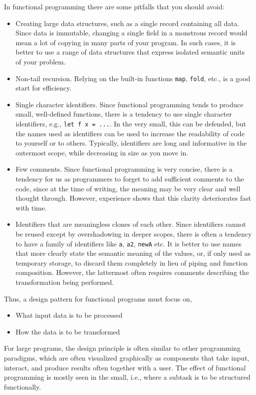 \documentclass[fsharpnotes.tex]{subfiles}
\begin{document}
In functional programming there are some pitfalls that you should avoid:
\begin{itemize}
\item Creating large data structures, such as a single record containing all data. Since data is immutable, changing a single field in a monstrous record would mean a lot of copying in many parts of your program. In such cases, it is better to use a range of data structures that express isolated semantic units of your problem.
\item Non-tail recursion. Relying on the built-in functions \lstinline{map}, \lstinline{fold}, etc., is a good start for efficiency.
\item Single character identifiers. Since functional programming tends to produce small, well-defined functions, there is a tendency to use single character identifiers, e.g., \lstinline{let f x = ...}. In the very small, this can be defended, but the names used as identifiers can be used to increase the readability of code to yourself or to others. Typically, identifiers are long and informative in the outermost scope, while decreasing in size as you move in.
\item Few comments. Since functional programming is very concise, there is a tendency for us as programmers to forget to add sufficient comments to the code, since at the time of writing, the meaning may be very clear and well thought through. However, experience shows that this clarity deteriorates fast with time.
\item Identifiers that are meaningless clones of each other. Since identifiers cannot be reused except by overshadowing in deeper scopes, there is often a tendency to have a family of identifiers like \lstinline{a}, \lstinline{a2}, \lstinline{newA} etc. It is better to use names that more clearly state the semantic meaning of the values, or, if only used as temporary storage, to discard them completely in lieu of piping and function composition. However, the lattermost often requires comments describing the transformation being performed.
\end{itemize}

Thus, a design pattern for functional programs must focus on,
\begin{itemize}
\item What input data is to be processed
\item How the data is to be transformed
\end{itemize}
For large programs, the design principle is often similar to other programming paradigms, which are often visualized graphically as components that take input, interact, and produce results often together with a user. The effect of functional programming is mostly seen in the small, i.e., where a subtask is to be structured functionally.
\end{document}
